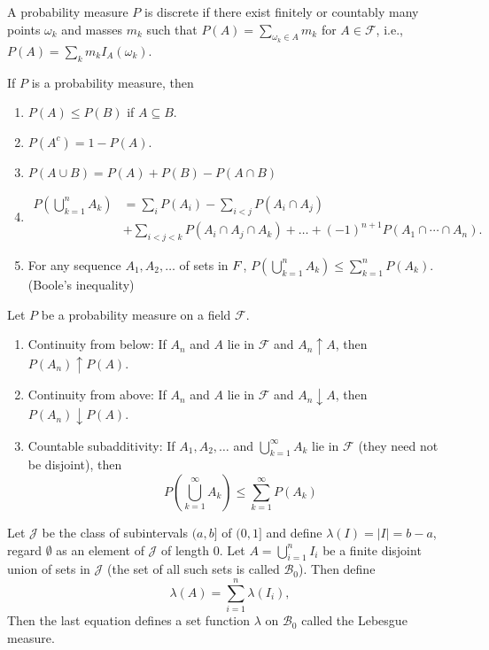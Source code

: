 \documentclass[12pt]{article}
\newcommand{\F}{\mathcal{F}}
\newcommand{\B}{\mathcal{B}}
\newcommand{\J}{\mathcal{J}}
\newcommand{\seq}{\subseteq}
\newcommand{\es}{\emptyset}
\newcommand{\mc}{\mathcal}
\newcommand{\un}{\cup}
\newcommand{\ic}{\cap}
\newenvironment{theorem}[2][Theorem]{\begin{trivlist}
\item[\hskip \labelsep {\bfseries #1}\hskip \labelsep {\bfseries #2.}]}{\end{trivlist}}
\newenvironment{defn}[2][Definition]{\begin{trivlist}
\item[\hskip \labelsep {\bfseries #1}\hskip \labelsep {\bfseries #2.}]}{\end{trivlist}}
\newenvironment{rmrk}[2][Remark]{\begin{trivlist}
\item[\hskip \labelsep {\bfseries #1}\hskip \labelsep {\bfseries #2.}]}{\end{trivlist}}
\begin{document}
\begin{defn}{10}
    A probability measure $P$ is discrete if there exist finitely or countably many points $\omega_k$ and masses $m_k$ such that $P(A) = \sum_{\omega_k \in A} m_k$ for $A \in \F$, i.e., $P(A) = \sum_{k} m_k I_A (\omega_k)$.
\end{defn}

\begin{rmrk}{11}
    If $P$ is a probability measure, then
    \begin{enumerate}
        \item $P(A) \leq P(B)$ if $A \seq B$.
        \item $P(A^c) = 1 - P(A)$.
        \item $P(A \un B) = P(A) + P(B) - P(A \ic B)$
        \item 
        \begin{align*}
            P\left ( \bigcup_{k=1}^{n} A_k \right) &= \sum_{i} P(A_i) - \sum_{i < j} P(A_i \ic A_j) \\
            &+ \sum_{i < j < k} P(A_i \ic A_j \ic A_k) + \ldots + (-1)^{n+1} P(A_1 \ic \cdots \ic A_n).
        \end{align*}
        \item For any sequence $A_1, A_2, \ldots$ of sets in $\mc \F$, $P( \bigcup_{k=1}^{n} A_k) \leq \sum_{k=1}^{n} P(A_k)$. (Boole's inequality)
    \end{enumerate}
\end{rmrk}

\begin{theorem}{2.1}
    Let $P$ be a probability measure on a field $\mc F$.
    \begin{enumerate}
        \item Continuity from below: If $A_n$ and $A$ lie in $\F$ and $A_n \uparrow A$, then $P(A_n) \uparrow P(A)$.
        \item Continuity from above: If $A_n$ and $A$ lie in $\F$ and $A_n \downarrow A$, then $P(A_n) \downarrow P(A)$.
        \item Countable subadditivity: If $A_1, A_2, \ldots$ and $\bigcup_{k=1}^{\infty} A_k$ lie in $\F$ (they need not be disjoint), then
        \[ P \left ( \bigcup_{k=1}^{\infty} A_k \right) \leq \sum_{k=1}^{\infty} P(A_k) \]
    \end{enumerate}
\end{theorem}

\begin{defn}{12}
    Let $\J$ be the class of subintervals $(a, b]$ of $(0, 1]$ and define $\lambda (I) = |I| = b - a$, regard $\es$ as an element of $\J$ of length $0$. Let $A = \bigcup_{i=1}^{n} I_i$ be a finite disjoint union of sets in $\J$ (the set of all such sets is called $\B_0$). Then define \[ \lambda (A) = \sum_{i=1}^{n} \lambda(I_i), \]
    Then the last equation defines a set function $\lambda$ on $\B_0$ called the Lebesgue measure.
\end{defn}
\end{document}
